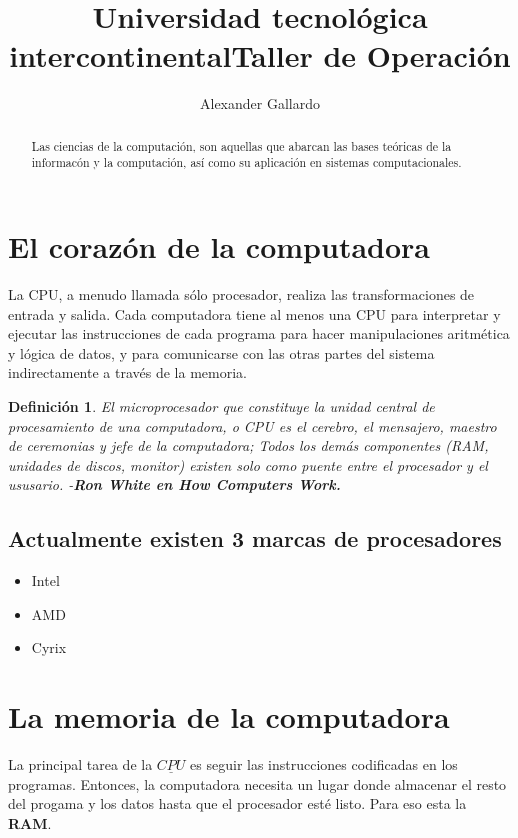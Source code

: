 \documentclass[a4papper, 12pt]{article}
\title{Universidad tecnológica intercontinental}
\title{Taller de Operación}
\author{Alexander Gallardo}
\date{}
\newtheorem{definition}{Definición}%
\begin{document}
	\maketitle
		
	\begin{abstract}
		Las ciencias de la computación, son aquellas que abarcan las bases teóricas de la informacón y la computación, así como su aplicación en sistemas computacionales.
	\end{abstract}
	\section{El corazón de la computadora}
		La CPU, a menudo llamada sólo procesador, realiza las transformaciones de entrada y salida. Cada computadora tiene al menos una CPU para interpretar y ejecutar las instrucciones de cada programa para hacer manipulaciones aritmética y lógica de datos, y para comunicarse con las otras partes del sistema indirectamente a través de la memoria.
		
		\begin{definition}
			El microprocesador que constituye la unidad central de procesamiento de una computadora, o CPU es el cerebro, el mensajero, maestro de ceremonias y jefe de la computadora; Todos los demás componentes (RAM, unidades de discos, monitor) existen solo como puente entre el procesador y el ususario. -\textbf{Ron White en How Computers Work.}
		\end{definition}
		
		\subsection{Actualmente existen 3 marcas de procesadores}
			\begin{itemize}
				\item Intel
				\item AMD
				\item Cyrix
			\end{itemize}
	\section{La memoria de la computadora}
		La principal tarea de la $\underline{CPU}$ es seguir las instrucciones codificadas en los programas. Entonces, la computadora necesita un lugar donde almacenar el resto del progama y los datos hasta que el procesador esté listo. Para eso esta la \textbf{RAM}.
		
\end{document}
